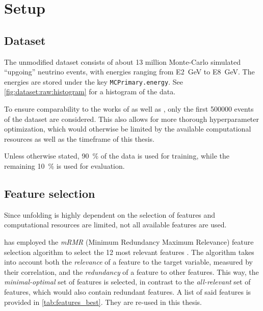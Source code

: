\section{Setup}

\subsection{Dataset}
The unmodified dataset \cite{icecube_mc} consists of about 13 million Monte-Carlo simulated \enquote{upgoing} neutrino events,
with energies ranging from \SI{E2}{\giga\electronvolt} to \SI{E8}{\giga\electronvolt}.
The energies are stored under the key \texttt{MCPrimary.energy}. %
See \autoref{fig:dataset:raw:histogram} for a histogram of the data.

To ensure comparability to the works of \citeauthor{dsea_samuel} as well as \citeauthor{dsea_jan},
only the first \num{500000} events of the dataset are considered.
This also allows for more thorough hyperparameter optimization,
which would otherwise be limited by the available computational resources as well as the timeframe of this thesis.

Unless otherwise stated, %
\SI{90}{\percent} of the data is used for training,
while the remaining \SI{10}{\percent} is used for evaluation.


\subsection{Feature selection}
Since
  unfolding is highly dependent on the selection of features \citationneeded
  and computational resources are limited,
not all available features are used.

\citeauthor{dsea_jan} has employed the \emph{mRMR} (Minimum Redundancy Maximum Relevance) feature selection algorithm \cite{mrmr}
to select the 12 most relevant features \cite{dsea_jan}.
The algorithm takes into account both
  the \emph{relevance} of a feature to the target variable,
    measured by their correlation,
  and the \emph{redundancy} of a feature to other features.
This way,
the \emph{minimal-optimal} set of features is selected,
  in contrast to the \emph{all-relevant} set of features,
    which would also contain redundant features.
A list of said features is provided in \autoref{tab:features_best}.
They are re-used in this thesis.

